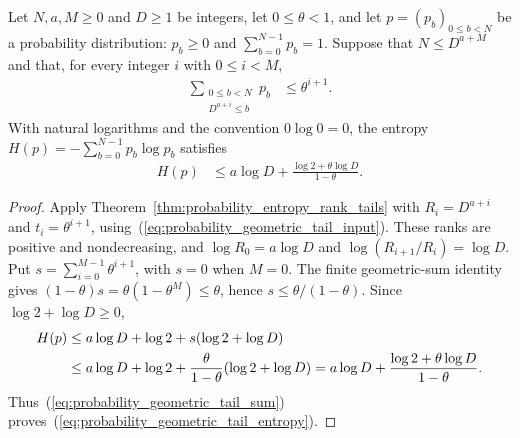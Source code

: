 \begin{theorem}
    \label{thm:probability_entropy_geometric_rank_tails}
    \leanok
    Let $N,a,M\geq0$ and $D\geq1$ be integers, let $0\leq\theta<1$,
    and let $p=(p_b)_{0\leq b<N}$ be a probability distribution:
    $p_b\geq0$ and $\sum_{b=0}^{N-1}p_b=1$.
    Suppose that $N\leq D^{a+M}$ and that, for every integer
    $i$ with $0\leq i<M$,
    \begin{align}
        \sum_{\substack{0\leq b<N \\D^{a+i}\leq b}}p_b
         & \leq\theta^{i+1}.
        \label{eq:probability_geometric_tail_input}
    \end{align}
    With natural logarithms and the convention $0\log0=0$, the entropy
    $H(p)=-\sum_{b=0}^{N-1}p_b\log p_b$ satisfies
    \begin{align}
        H(p)
         & \leq a\log D+\frac{\log2+\theta\log D}{1-\theta}.
        \label{eq:probability_geometric_tail_entropy}
    \end{align}
\end{theorem}
\begin{proof}\leanok
    Apply Theorem~\ref{thm:probability_entropy_rank_tails} with
    $R_i=D^{a+i}$ and $t_i=\theta^{i+1}$,
    using~(\ref{eq:probability_geometric_tail_input}).
    These ranks are positive and nondecreasing, and
    $\log R_0=a\log D$ and $\log(R_{i+1}/R_i)=\log D$.
    Put $s=\sum_{i=0}^{M-1}\theta^{i+1}$, with $s=0$ when $M=0$.
    The finite geometric-sum identity gives
    $(1-\theta)s=\theta(1-\theta^M)\leq\theta$,
    hence $s\leq\theta/(1-\theta)$.
    Since $\log2+\log D\geq0$,
    \begin{align}
        H(p)
         & \leq a\log D+\log2+s(\log2+\log D) \notag \\
         & \leq a\log D+\log2
        +\frac{\theta}{1-\theta}(\log2+\log D)
        =a\log D+\frac{\log2+\theta\log D}{1-\theta}.
        \label{eq:probability_geometric_tail_sum}
    \end{align}
    Thus~(\ref{eq:probability_geometric_tail_sum}) proves~(\ref{eq:probability_geometric_tail_entropy}).
\end{proof}

